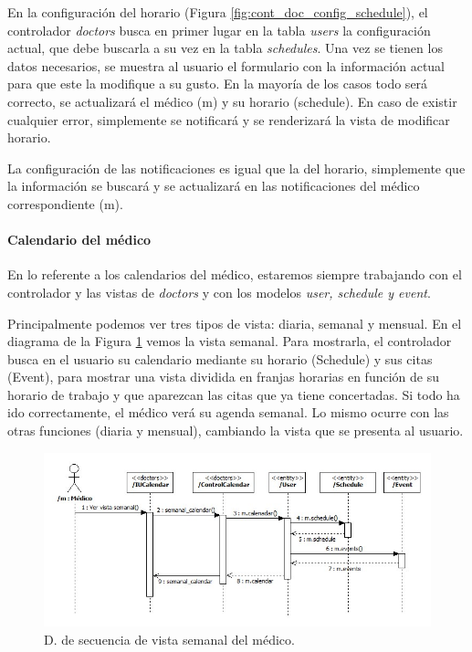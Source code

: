 				En la configuración del horario (Figura \ref{fig:cont_doc_config_schedule}), el controlador \textit{doctors} busca en primer lugar en la tabla \textit{users} la configuración actual, que debe buscarla a su vez en la tabla \textit{schedules}. Una vez se tienen los datos necesarios, se muestra al usuario el formulario con la información actual para que este la modifique a su gusto. En la mayoría de los casos todo será correcto, se actualizará el médico (m) y su horario (schedule). En caso de existir cualquier error, simplemente se notificará y se renderizará la vista de modificar horario.
				
				La configuración de las notificaciones es igual que la del horario, simplemente que la información se buscará y se actualizará en las notificaciones del médico correspondiente (m).
			
				\paragraph{Calendario del médico} %
				\label{subp:cont_calendario}
				
					En lo referente a los calendarios del médico, estaremos siempre trabajando con el controlador y las vistas de \textit{doctors} y con los modelos \textit{user, schedule y event}.
					
					Principalmente podemos ver tres tipos de vista: diaria, semanal y mensual. En el diagrama de la Figura \ref{fig:cont_doc_calendar} vemos la vista semanal. Para mostrarla, el controlador busca en el usuario su calendario mediante su horario (Schedule) y sus citas (Event), para mostrar una vista dividida en franjas horarias en función de su horario de trabajo y que aparezcan las citas que ya tiene concertadas. Si todo ha ido correctamente, el médico verá su agenda semanal. Lo mismo ocurre con las otras funciones (diaria y mensual), cambiando la vista que se presenta al usuario.
					
					\begin{figure}[H]
					  \centering
					    \includegraphics[width=16cm]{img/jpg/secuencia/4_doc_calendar_semanal.jpg}
					  \caption{D. de secuencia de vista semanal del médico.}
					  \label{fig:cont_doc_calendar}
					\end{figure}
					
